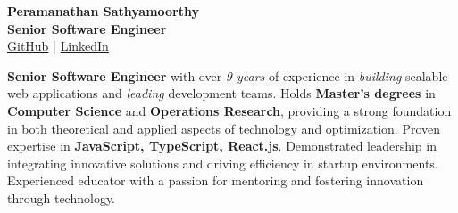 \begin{minipage}[t]{0.61\textwidth}
\setlength{\parskip}{1ex}%

\vspace{2ex}

\begin{center}
\vspace{2ex}
\textbf{\Huge Peramanathan Sathyamoorthy}\\[3pt]
\vspace{1ex}
\textbf{\Large Senior Software Engineer}\\[6pt]
\href{https://github.com/p10ns11y}{\color{cvblue}GitHub} | \href{https://www.linkedin.com/in/sathyam-peram/}{\color{cvblue}LinkedIn}
\end{center}

\vspace{0.5em}
\Large
\textbf{Senior Software Engineer} with over \textit{9 years} of experience in \textit{building} scalable web applications and \textit{leading} development teams.
Holds \textbf{Master's degrees} in \textbf{Computer Science} and \textbf{Operations Research}, providing a strong foundation in both theoretical and applied aspects of technology and optimization.
Proven expertise in \textbf{JavaScript, TypeScript, React.js}. Demonstrated leadership in integrating innovative solutions and driving efficiency in startup environments.
Experienced educator with a passion for mentoring and fostering innovation through technology.

\vspace{1ex}

\vspace{0.5em}


\end{minipage}
